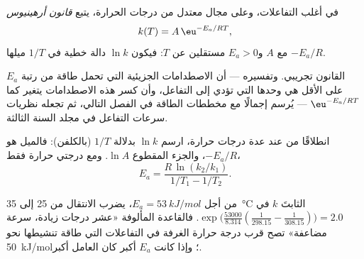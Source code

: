 \begin{theorem}\label{thm:b1:rate-laws:arrhenius}
في أغلب التفاعلات، وعلى مجال معتدل من درجات الحرارة، يتبع  \emph{قانون أرهينيوس}
\[
  k(T) = A\,\eu^{-E_a/RT} ,
\]
مع $A$ و$E_a > 0$ مستقلين عن $T$: فيكون $\ln k$ دالة خطية في
$1/T$ ميلها $-E_a/R$.
\end{theorem}
\admitted

\begin{remark}[معنى $E_a$]\label{rem:b1:rate-laws:meaning}
القانون تجريبي. وتفسيره --- أن الاصطدامات الجزيئية التي
تحمل طاقة من رتبة $E_a$ على الأقل هي وحدها التي تؤدي إلى التفاعل، وأن
كسر هذه الاصطدامات يتغير كما $\eu^{-E_a/RT}$ --- يُرسم إجمالًا
مع مخططات الطاقة في الفصل التالي، ثم تجعله 
نظريات سرعات التفاعل في مجلد السنة الثالثة.
\end{remark}

\begin{method}[تعيين $E_a$]\label{met:b1:rate-laws:arrhenius-plot}
انطلاقًا من  عند عدة درجات حرارة، ارسم $\ln k$ بدلالة $1/T$
(بالكلفن): فالميل هو $-E_a/R$، والجزء المقطوع $\ln A$. ومع درجتي
حرارة فقط،
\[
  E_a = \frac{R\,\ln(k_2/k_1)}{1/T_1 - 1/T_2} .
\]
\end{method}

\begin{example}\label{ex:b1:rate-laws:doubling}
من أجل $E_a = \qty{53}{kJ/mol}$، يضرب الانتقال من 25 إلى \qty{35}{\celsius}
الثابتَ $k$ في $\exp\!\big(\frac{53000}{8.314}(\frac{1}{298.15} -
\frac{1}{308.15})\big) = 2.0$. فالقاعدة المألوفة «عشر درجات زيادة، سرعة
مضاعفة» تصح قرب درجة حرارة الغرفة في التفاعلات التي طاقة تنشيطها
نحو \qty{50}{kJ/mol}؛ وإذا كانت $E_a$ أكبر كان العامل أكبر.
\end{example}

